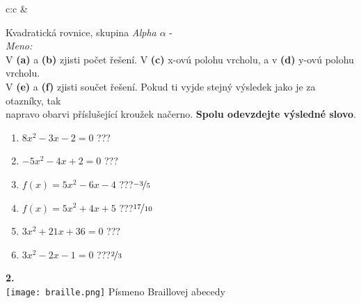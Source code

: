 \documentclass[10pt]{report}
\begin{document}
\begin{tabular}{c:c}
&
\begin{minipage}[c][99mm][t]{0.49\linewidth}
\begin{center}
\vspace{7mm}
{\huge Kvadratická rovnice, skupina \textit{Alpha $\alpha$} -}\\[4.5mm]
\textit{Meno:}\phantom{xxxxxxxxxxxxxxxxxxxxxxxxxxxxxxxxxxxxxxxxxxxxxxxxxxxxxxxxxxxxxxxxx}\\[3.5mm]
V \textbf{(a)} a \textbf{(b)} zjisti počet řešení. V \textbf{(c)} x-ovú polohu vrcholu, a v \textbf{(d)} y-ovú polohu vrcholu.\\V \textbf{(e)} a \textbf{(f)} zjisti součet řešení. Pokud ti vyjde stejný výsledek jako je za otazníky, tak\\napravo obarvi příslušející kroužek načerno. \textbf{Spolu odevzdejte výsledné slovo}.\\[3mm]
\begin{minipage}{0.77\linewidth}
\begin{center}
\begin{varwidth}{\textwidth}
\begin{enumerate}
\large
\item $8x^2-3x-2=0$\quad \dotfill\; ???\;\dotfill {}
\item $-5x^2-4x+2=0$\quad \dotfill\; ???\;\dotfill {}
\item $f(x)=5x^2-6x-4$\quad \dotfill\; ???\;\dotfill \quad $\nicefrac{-3}{5}$
\item $f(x)=5x^2+4x+5$\quad \dotfill\; ???\;\dotfill \quad $\nicefrac{17}{10}$
\item $3x^2+21x+36=0$\quad \dotfill\; ???\;\dotfill {}
\item $3x^2-2x-1=0$\quad \dotfill\; ???\;\dotfill \quad $\nicefrac{2}{3}$
\end{enumerate}
\end{varwidth}
\end{center}
\end{minipage}
\begin{minipage}{0.20\linewidth}
\begin{center}
{\Huge\bfseries 2.} \\[2mm]
\texttt{[image: braille.png]}
{\small Písmeno Braillovej abecedy}
\end{center}
\end{minipage}
\end{center}
\end{minipage}
\\ \hdashline
\begin{minipage}[c][99mm][t]{0.49\linewidth}

\end{minipage}
\end{tabular}
\end{document}
